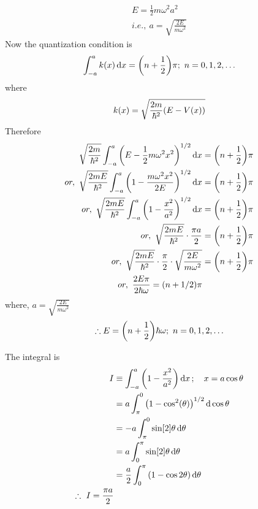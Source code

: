 \begin{enumerate}
	\begin{align*}
		E = \frac{1}{2} m \omega^2 a^2 \\
		i.e.,\ a = \sqrt{\frac{2 E}{m \omega^2}}
	\end{align*}
	Now the quantization condition is
	\begin{equation}
	 \label{chapter22.ex1-eqn1}
		\int_{-a}^{a} k(x) \dd{x} = \qty(n + \frac{1}{2}) \pi ; \ n=0,1,2,\ldots
	\end{equation}
	where
	\begin{equation*}
		k(x) = \sqrt{\frac{2 m}{\hbar^2} \qty(E - V(x))}
	\end{equation*}
	Therefore
	\begin{align*}
		\sqrt{\frac{2 m}{\hbar^2}} \int_{-a}^{a} \qty(E - \frac{1}{2}m\omega^2 x^2)^{1/2} \dd{x} &= \qty(n + \frac{1}{2})\pi \\
		or, \ \sqrt{\frac{2 m E}{\hbar^2}} \int_{-a}^{a} \qty(1 - \frac{m\omega^2 x^2}{2 E})^{1/2} \dd{x} &= \qty(n + \frac{1}{2})\pi \\
		or, \ \sqrt{\frac{2 m E}{\hbar^2}} \int_{-a}^{a} \qty(1 - \frac{x^2}{a^2})^{1/2} \dd{x} &= \qty(n + \frac{1}{2})\pi \\
		or, \ \sqrt{\frac{2 m E}{\hbar^2}} \cdot \frac{\pi a}{2} &= \qty(n + \frac{1}{2})\pi \\
		or, \ \sqrt{\frac{2 m E}{\hbar^2}} \cdot \frac{\pi}{2} \cdot \sqrt{\frac{2 E}{m \omega^2}} &= \qty(n + \frac{1}{2})\pi \\
		or, \ \frac{2 E \pi}{2 \hbar \omega} = \qty(n + 1/2) \pi
	\end{align*}
	where, $a = \sqrt{\frac{2 E}{m \omega^2}}$
	\begin{equation}
		\therefore E = \qty(n + \frac{1}{2}) \hbar\omega; \ n = 0,1,2,\ldots
	\end{equation}
	
	The integral is
	\begin{align*}
	 I &\equiv \int_{-a}^{a} \qty(1 - \frac{x^2}{a^2}) \dd{x} ;\quad x = a \cos\theta \\
	 &=  a \int_{\pi}^{0} \qty(1 - \cos[2](\theta))^{1/2} \dd{\cos\theta} \\
	 &= - a \int_{\pi}^{0} \sin [2] \theta \dd{\theta} \\
	 &= a \int_{0}^{\pi} \sin [2] \theta \dd{\theta} \\
	 &= \frac{a}{2} \int_{0}^{\pi} \qty(1 - \cos 2 \theta) \dd{\theta} \\
	 \therefore\ I = \frac{\pi a}{2}
	\end{align*}
	

\end{enumerate}
